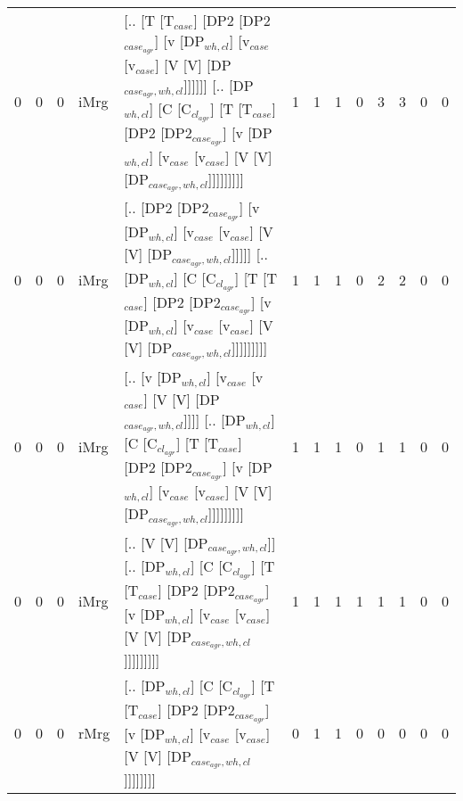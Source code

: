 \begin{tabularx}{\linewidth}{rrrlXrrrrrrrr}
   0 &       0 &   0 & iMrg & [.. [T [T$_{case}$] [DP2 [DP2$_{case_{agr}}$] [v [DP$_{wh,cl}$] [v$_{case}$ [v$_{case}$] [V [V] [DP$_{case_{agr},wh,cl}$]]]]]] [.. [DP$_{wh,cl}$] [C [C$_{cl_{agr}}$] [T [T$_{case}$] [DP2 [DP2$_{case_{agr}}$] [v [DP$_{wh,cl}$] [v$_{case}$ [v$_{case}$] [V [V] [DP$_{case_{agr},wh,cl}$]]]]]]]]]                &            1 &             1 &             1 &                  0 &           3 &           3 &                0 &              0 \\
   0 &       0 &   0 & iMrg & [.. [DP2 [DP2$_{case_{agr}}$] [v [DP$_{wh,cl}$] [v$_{case}$ [v$_{case}$] [V [V] [DP$_{case_{agr},wh,cl}$]]]]] [.. [DP$_{wh,cl}$] [C [C$_{cl_{agr}}$] [T [T$_{case}$] [DP2 [DP2$_{case_{agr}}$] [v [DP$_{wh,cl}$] [v$_{case}$ [v$_{case}$] [V [V] [DP$_{case_{agr},wh,cl}$]]]]]]]]]                             &            1 &             1 &             1 &                  0 &           2 &           2 &                0 &              0 \\
   0 &       0 &   0 & iMrg & [.. [v [DP$_{wh,cl}$] [v$_{case}$ [v$_{case}$] [V [V] [DP$_{case_{agr},wh,cl}$]]]] [.. [DP$_{wh,cl}$] [C [C$_{cl_{agr}}$] [T [T$_{case}$] [DP2 [DP2$_{case_{agr}}$] [v [DP$_{wh,cl}$] [v$_{case}$ [v$_{case}$] [V [V] [DP$_{case_{agr},wh,cl}$]]]]]]]]]                                                  &            1 &             1 &             1 &                  0 &           1 &           1 &                0 &              0 \\
   0 &       0 &   0 & iMrg & [.. [V [V] [DP$_{case_{agr},wh,cl}$]] [.. [DP$_{wh,cl}$] [C [C$_{cl_{agr}}$] [T [T$_{case}$] [DP2 [DP2$_{case_{agr}}$] [v [DP$_{wh,cl}$] [v$_{case}$ [v$_{case}$] [V [V] [DP$_{case_{agr},wh,cl}$]]]]]]]]]                                                                                   &            1 &             1 &             1 &                  1 &           1 &           1 &                0 &              0 \\
   0 &       0 &   0 & rMrg & [.. [DP$_{wh,cl}$] [C [C$_{cl_{agr}}$] [T [T$_{case}$] [DP2 [DP2$_{case_{agr}}$] [v [DP$_{wh,cl}$] [v$_{case}$ [v$_{case}$] [V [V] [DP$_{case_{agr},wh,cl}$]]]]]]]]                                                                                                                    &            0 &             1 &             1 &                  0 &           0 &           0 &                0 &              0 \\
\hline
\end{tabularx}\endgroup\\
